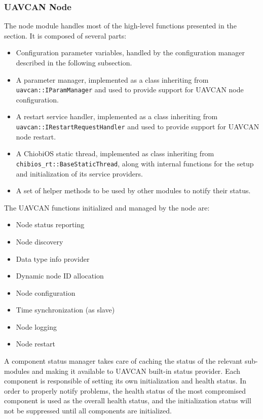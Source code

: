 \subsubsection{UAVCAN Node}
The node module handles most of the high-level functions presented in the  section.
It is composed of several parts:
\begin{itemize}
    \item Configuration parameter variables, handled by the configuration manager described in the following subsection.
    \item A parameter manager, implemented as a class inheriting from \texttt{uavcan::IParamManager} and used to provide support for UAVCAN node configuration.
    \item A restart service handler, implemented as a class inheriting from \texttt{uavcan::IRestartRequestHandler} and used to provide support for UAVCAN node restart.
    \item A ChiobiOS static thread, implemented as class inheriting from \texttt{chibios_rt::BaseStaticThread}, along with internal functions for the setup and initialization of its service providers.
    \item A set of helper methods to be used by other modules to notify their status.
\end{itemize}

The UAVCAN functions initialized and managed by the node are:
\begin{itemize}
    \item Node status reporting
    \item Node discovery
    \item Data type info provider
    \item Dynamic node ID allocation
    \item Node configuration
    \item Time synchronization (as slave)
    \item Node logging
    \item Node restart
\end{itemize}

A component status manager takes care of caching the status of the relevant sub-modules and making it available to UAVCAN built-in status provider.
Each component is responsible of setting its own initialization and health status.
In order to properly notify problems, the health status of the most compromised component is used as the overall health status, and the initialization status will not be suppressed until all components are initialized.

